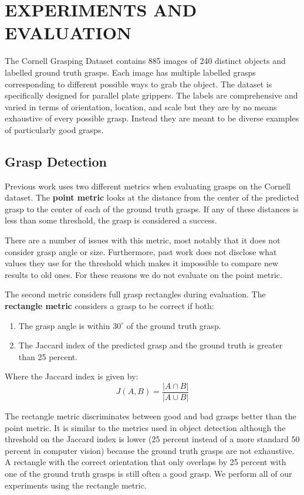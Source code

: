 \documentclass[letterpaper, 10 pt, conference]{ieeeconf}
\begin{document}
\section{EXPERIMENTS AND EVALUATION}

The Cornell Grasping Dataset \cite{cornelldata} contains 885 images of 240 distinct objects and labelled ground truth grasps. Each image has multiple labelled grasps corresponding to different possible ways to grab the object. The dataset is specifically designed for parallel plate grippers. The labels are comprehensive and varied in terms of orientation, location, and scale but they are by no means exhaustive of every possible grasp. Instead they are meant to be diverse examples of particularly good grasps.

\subsection{Grasp Detection}

Previous work uses two different metrics when evaluating grasps on the Cornell dataset. The \textbf{point metric} looks at the distance from the center of the predicted grasp to the center of each of the ground truth grasps. If any of these distances is less than some threshold, the grasp is considered a success.

There are a number of issues with this metric, most notably that it does not consider grasp angle or size. Furthermore, past work does not disclose what values they use for the threshold which makes it impossible to compare new results to old ones. For these reasons we do not evaluate on the point metric.

The second metric considers full grasp rectangles during evaluation. The \textbf{rectangle metric} considers a grasp to be correct if both:
\begin{enumerate}
\item
The grasp angle is within $30^{\circ}$ of the ground truth grasp.
\item 
The Jaccard index of the predicted grasp and the ground truth is greater than 25 percent.
\end{enumerate}
Where the Jaccard index is given by:
\[J(A,B)=\frac{|A\cap B|}{|A\cup B|}\]

The rectangle metric discriminates between good and bad grasps better than the point metric. It is similar to the metrics used in object detection although the threshold on the Jaccard index is lower (25 percent instead of a more standard 50 percent in computer vision) because the ground truth grasps are not exhaustive. A rectangle with the correct orientation that only overlaps by 25 percent with one of the ground truth grasps is still often a good grasp. We perform all of our experiments using the rectangle metric.
\end{document}
